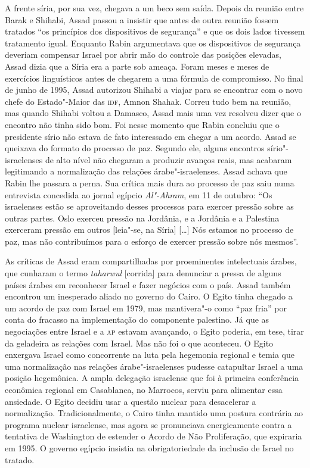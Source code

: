 A frente síria, por sua vez, chegava a um beco sem saída. Depois da
reunião entre Barak e Shihabi, Assad passou a insistir que antes de outra
reunião fossem tratados ``os princípios dos dispositivos de segurança''
e que os dois lados tivessem tratamento igual. Enquanto Rabin
argumentava que os dispositivos de segurança deveriam compensar Israel
por abrir mão do controle das posições elevadas, Assad dizia que a Síria
era a parte sob ameaça. Foram meses e meses de exercícios linguísticos
antes de chegarem a uma fórmula de compromisso. No final de junho de
1995, Assad autorizou Shihabi a viajar para se encontrar com o novo chefe
do Estado"-Maior das \textsc{idf}, Amnon Shahak. Correu tudo bem na reunião, mas
quando Shihabi voltou a Damasco, Assad mais uma vez resolveu dizer que o
encontro não tinha sido bom. Foi nesse momento que Rabin concluiu que o
presidente sírio não estava de fato interessado em chegar a um acordo.
Assad se queixava do formato do processo de paz. Segundo ele, alguns
encontros sírio"-israelenses de alto nível não chegaram a produzir
avanços reais, mas acabaram legitimando a normalização das relações
árabe"-israelenses. Assad achava que Rabin lhe passara a perna. Sua
crítica mais dura ao processo de paz saiu numa entrevista concedida ao
jornal egípcio \textit{Al"-Ahram}, em 11 de outubro: ``Os israelenses estão
se aproveitando desses processos para exercer pressão sobre as outras
partes. Oslo exerceu pressão na Jordânia, e a Jordânia e a Palestina
exerceram pressão em outros {[}leia"-se, na Síria{]} {[}\ldots{}{]} Nós estamos no
processo de paz, mas não contribuímos para o esforço de exercer pressão
sobre nós mesmos''.

As críticas de Assad eram compartilhadas por proeminentes intelectuais
árabes, que cunharam o termo \textit{taharwul} {[}corrida{]} para
denunciar a pressa de alguns países árabes em reconhecer Israel e fazer
negócios com o país. Assad também encontrou um inesperado aliado no
governo do Cairo. O Egito tinha chegado a um acordo de paz com Israel em
1979, mas mantivera"-o como ``paz fria'' por conta do fracasso na
implementação do componente palestino. Já que as negociações entre
Israel e a \textsc{ap} estavam avançando, o Egito poderia, em tese, tirar da
geladeira as relações com Israel. Mas não foi o que aconteceu. O Egito
enxergava Israel como concorrente na luta pela hegemonia regional e
temia que uma normalização nas relações árabe"-israelenses pudesse
catapultar Israel a uma posição hegemônica. A ampla delegação israelense
que foi à primeira conferência econômica regional em Casablanca, no
Marrocos, serviu para alimentar essa ansiedade. O Egito decidiu usar a
questão nuclear para desacelerar a normalização. Tradicionalmente, o
Cairo tinha mantido uma postura contrária ao programa nuclear israelense, mas agora
se pronunciava energicamente contra a tentativa de Washington de
estender o Acordo de Não Proliferação, que expiraria em 1995. O governo
egípcio insistia na obrigatoriedade da inclusão de Israel no tratado.

